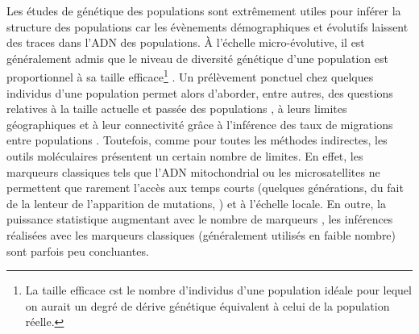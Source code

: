 \documentclass[a4paper,12pt,twoside]{article}\usepackage[]{graphicx}\usepackage[]{color}
\begin{document}
Les études de génétique des populations sont extrêmement utiles pour inférer la structure des populations car les évènements démographiques et évolutifs laissent des traces dans l'ADN des populations. À l'échelle micro-évolutive, il est généralement admis que le niveau de diversité génétique d'une population est proportionnel à sa taille efficace\footnote{La taille efficace cst le nombre d'individus d'une population idéale pour lequel on aurait un degré de dérive génétique équivalent à celui de la population réelle. } \citep[voir][pour une discussion à ce sujet]{bazin2006population, MK06a, Ey06}. Un prélèvement ponctuel chez quelques individus d'une population permet alors d'aborder, entre autres, des questions relatives à la taille actuelle et passée des populations \citep{tajima1989effect, beerli2001maximum}, à leurs limites géographiques \citep{franccois2010spatially, guillot2012} et à leur connectivité grâce à l'inférence des taux de migrations entre populations \citep{wilson2003bayesian}. Toutefois, comme pour toutes les méthodes indirectes, les outils moléculaires présentent un certain nombre de limites. En effet, les marqueurs classiques tels que l'ADN mitochondrial ou les microsatellites ne permettent que rarement l'accès aux temps courts (quelques générations, du fait de la lenteur de l'apparition de mutations, \citealp{drake1998rates}) et à l'échelle locale. En outre, la puissance statistique augmentant avec le nombre de marqueurs \citep{waples1998separating, latch2006relative}, les inférences réalisées avec les marqueurs classiques (généralement utilisés en faible nombre) sont parfois peu concluantes. 
\end{document}

